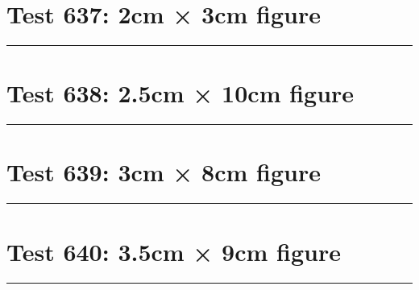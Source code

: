 \documentclass[a4paper,11pt]{article}
\begin{document}
\section*{Test 637: 2cm × 3cm figure}
\begin{swarmwrap}%
  \begin{minipage}[t]{2cm}
    \centering
    \rule{\linewidth}{3cm}
  \end{minipage}%
\end{swarmwrap}%
\swarmwrapnext
\lipsum[63]
\lipsum[64]
\lipsum[65]
\lipsum[66]
\section*{Test 638: 2.5cm × 10cm figure}
\begin{swarmwrap}%
  \begin{minipage}[t]{2cm}
    \centering
    \rule{\linewidth}{10cm}
  \end{minipage}%
\end{swarmwrap}%
\swarmwrapnext
\lipsum[92]
\lipsum[93]
\lipsum[94]
\lipsum[95]
\lipsum[96]
\section*{Test 639: 3cm × 8cm figure}
\begin{swarmwrap}%
  \begin{minipage}[t]{3cm}
    \centering
    \rule{\linewidth}{8cm}
  \end{minipage}%
\end{swarmwrap}%
\swarmwrapnext
\lipsum[97]
\lipsum[98]
\lipsum[99]
\section*{Test 640: 3.5cm × 9cm figure}
\begin{swarmwrap}%
  \begin{minipage}[t]{3cm}
    \centering
    \rule{\linewidth}{9cm}
  \end{minipage}%
\end{swarmwrap}%
\swarmwrapnext
\lipsum[59]
\lipsum[60]
\lipsum[61]
\lipsum[62]
\end{document}
